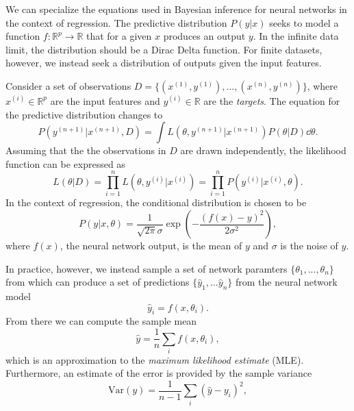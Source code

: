 We can specialize the equations used in Bayesian inference for neural networks in the context of regression.
The predictive distribution $P(y|x)$ seeks to model a function $f : \mathbb{R}^p \to \mathbb{R}$ that for a given $x$ produces an output $y$. In the infinite data limit, the distribution should be a Dirac Delta function. For finite datasets, however, we instead seek a distribution of outputs given the input features.

Consider a set of observations $D = \{(x^{(1)}, y^{(1)}), ..., (x^{(n)}, y^{(n)})\}$, where $x^{(i)} \in \mathbb{R}^p$ are the input features and $y^{(i)} \in \mathbb{R}$ are the \textit{targets}. The equation for the predictive distribution changes to
\begin{equation}
  P(y^{(n+1)}|x^{(n+1)}, D) = \int L(\theta, y^{(n+1)}|x^{(n+1)})P(\theta|D)\dd \theta.
\end{equation}
Assuming that the the observations in $D$ are drawn independently, the likelihood function can be expressed as
\begin{equation}
  L(\theta|D) = \prod_{i=1}^n L(\theta, y^{(i)}|x^{(i)}) = \prod_{i=1}^n P(y^{(i)}|x^{(i)}, \theta).
\end{equation}
In the context of regression, the conditional distribution is chosen to be
\begin{equation}
  P(y|x, \theta) = \frac{1}{\sqrt{2\pi}\sigma}\exp\left(-\frac{(f(x) - y)^2}{2\sigma^2}\right),
\end{equation}
where $f(x)$, the neural network output, is the mean of $y$ and $\sigma$ is the noise of $y$.

In practice, however, we instead sample a set of network paramters $\{\theta_1, ..., \theta_n\}$ from which can produce a set of predictions $\{\hat{y}_1,\ldots \hat{y}_n\}$ from the neural network model 
\begin{equation}
  \hat{y}_i = f(x, \theta_i).
\end{equation}
From there we can compute the sample mean
\begin{equation}
  \hat{y} = \frac{1}{n}\sum_i f(x, \theta_i),
\end{equation}
which is an approximation to the \textit{maximum likelihood estimate} (MLE). Furthermore, an estimate of the error is provided by the sample variance
\begin{equation}
  \text{Var} (y) = \frac{1}{n-1}\sum_i (\hat{y} - y_i)^2,
\end{equation}


